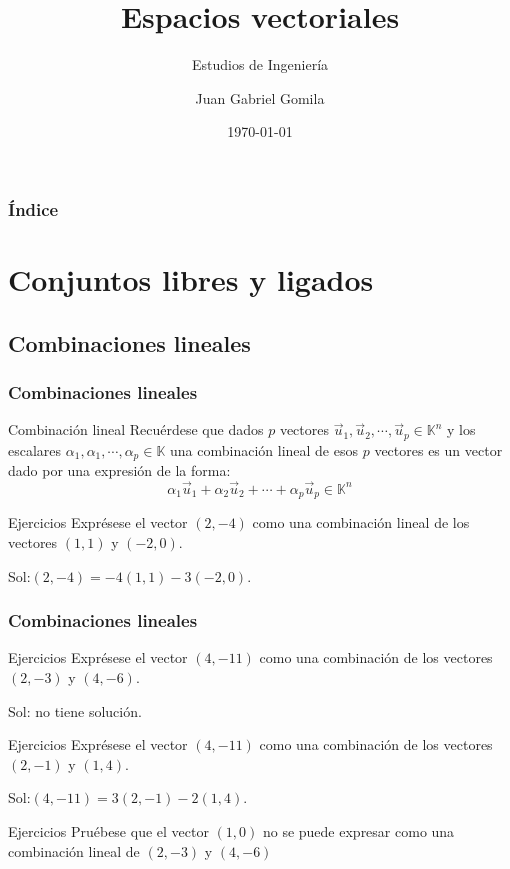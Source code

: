\documentclass{beamer}
\title[Tema 3 - Espacios vectoriales]{Espacios vectoriales}
\subtitle{Estudios de Ingenier\'ia}
\author[https://frogames.es]{
Juan Gabriel Gomila%
}
\institute[Frogames]{
 Frogames
   \and
  \texttt{https://frogames.es}
}
\date{\today}
\begin{document}
 

\frame{\titlepage}

\begin{frame}
  \frametitle{\'Indice}
  \tableofcontents
\end{frame}

\section{Conjuntos libres y ligados}
\subsection{Combinaciones lineales}

\begin{frame}
  \frametitle{Combinaciones lineales}
  \begin{block}{Combinaci\'on lineal}
Recu\'erdese que dados $p$ vectores $\vec u_1,\vec u_2,\cdots,\vec u_p\in\mathbb K^n$ y los escalares $\alpha_1,\alpha_1,\cdots,\alpha_p\in\mathbb K$ una combinaci\'on lineal de esos $p$ vectores es un vector dado por una expresi\'on de la forma:
\[\alpha_1\vec u_1+\alpha_2\vec u_2+\cdots+\alpha_p\vec u_p\in \mathbb K^n\]
\end{block}

\begin{block}{Ejercicios}
Expr\'esese el vector $(2,-4)$ como una combinaci\'on lineal de los vectores $(1,1)$ y $(-2,0)$.
\end{block}
Sol:$(2,-4) = -4(1,1)-3(-2,0)$.
\end{frame}

\begin{frame}
  \frametitle{Combinaciones lineales}
  \begin{block}{Ejercicios}
Expr\'esese el vector $(4,-11)$ como una combinaci\'on de los vectores $(2,-3)$ y $(4,-6)$.
\end{block}
Sol: no tiene soluci\'on.
\begin{block}{Ejercicios}
Expr\'esese el vector $(4,-11)$ como una combinaci\'on de los vectores $(2,-1)$ y $(1,4)$.
\end{block}
Sol:$(4,-11) = 3(2,-1)-2(1,4)$.
\begin{block}{Ejercicios}
Pru\'ebese que el vector $(1,0)$ no se puede expresar como una combinaci\'on lineal de $(2,-3)$ y $(4,-6)$
\end{block}
\end{frame}
\end{document}
